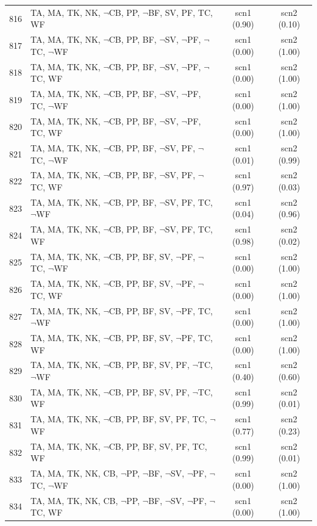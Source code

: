 \documentclass[12pt]{article}
\begin{document}
\begin{longtable}{|l|l|c|c|}
816 & TA, MA, TK, NK, $\neg$CB, PP, $\neg$BF, SV, PF, TC, WF & scn1 (0.90) & scn2 (0.10)\\
817 & TA, MA, TK, NK, $\neg$CB, PP, BF, $\neg$SV, $\neg$PF, $\neg$TC, $\neg$WF & scn1 (0.00) & scn2 (1.00)\\
818 & TA, MA, TK, NK, $\neg$CB, PP, BF, $\neg$SV, $\neg$PF, $\neg$TC, WF & scn1 (0.00) & scn2 (1.00)\\
819 & TA, MA, TK, NK, $\neg$CB, PP, BF, $\neg$SV, $\neg$PF, TC, $\neg$WF & scn1 (0.00) & scn2 (1.00)\\
820 & TA, MA, TK, NK, $\neg$CB, PP, BF, $\neg$SV, $\neg$PF, TC, WF & scn1 (0.00) & scn2 (1.00)\\
821 & TA, MA, TK, NK, $\neg$CB, PP, BF, $\neg$SV, PF, $\neg$TC, $\neg$WF & scn1 (0.01) & scn2 (0.99)\\
822 & TA, MA, TK, NK, $\neg$CB, PP, BF, $\neg$SV, PF, $\neg$TC, WF & scn1 (0.97) & scn2 (0.03)\\
823 & TA, MA, TK, NK, $\neg$CB, PP, BF, $\neg$SV, PF, TC, $\neg$WF & scn1 (0.04) & scn2 (0.96)\\
824 & TA, MA, TK, NK, $\neg$CB, PP, BF, $\neg$SV, PF, TC, WF & scn1 (0.98) & scn2 (0.02)\\
825 & TA, MA, TK, NK, $\neg$CB, PP, BF, SV, $\neg$PF, $\neg$TC, $\neg$WF & scn1 (0.00) & scn2 (1.00)\\
826 & TA, MA, TK, NK, $\neg$CB, PP, BF, SV, $\neg$PF, $\neg$TC, WF & scn1 (0.00) & scn2 (1.00)\\
827 & TA, MA, TK, NK, $\neg$CB, PP, BF, SV, $\neg$PF, TC, $\neg$WF & scn1 (0.00) & scn2 (1.00)\\
828 & TA, MA, TK, NK, $\neg$CB, PP, BF, SV, $\neg$PF, TC, WF & scn1 (0.00) & scn2 (1.00)\\
829 & TA, MA, TK, NK, $\neg$CB, PP, BF, SV, PF, $\neg$TC, $\neg$WF & scn1 (0.40) & scn2 (0.60)\\
830 & TA, MA, TK, NK, $\neg$CB, PP, BF, SV, PF, $\neg$TC, WF & scn1 (0.99) & scn2 (0.01)\\
831 & TA, MA, TK, NK, $\neg$CB, PP, BF, SV, PF, TC, $\neg$WF & scn1 (0.77) & scn2 (0.23)\\
832 & TA, MA, TK, NK, $\neg$CB, PP, BF, SV, PF, TC, WF & scn1 (0.99) & scn2 (0.01)\\
833 & TA, MA, TK, NK, CB, $\neg$PP, $\neg$BF, $\neg$SV, $\neg$PF, $\neg$TC, $\neg$WF & scn1 (0.00) & scn2 (1.00)\\
834 & TA, MA, TK, NK, CB, $\neg$PP, $\neg$BF, $\neg$SV, $\neg$PF, $\neg$TC, WF & scn1 (0.00) & scn2 (1.00)\\

\end{longtable}
\end{document}
